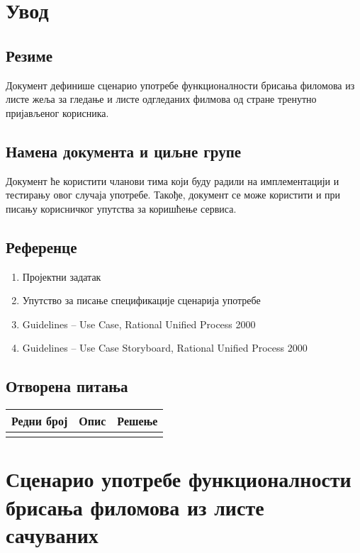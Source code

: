 \section{Увод}

\subsection{Резиме}

Документ дефинише сценарио употребе функционалности брисања филомова из листе жеља за гледање и листе 
одгледаних филмова од стране тренутно пријављеног корисника.

\subsection{Намена документа и циљне групе}

Документ ће користити чланови тима који буду радили на имплементацији и тестирању овог случаја
употребе. Такође, документ се може користити и при писању корисничког упутства за коришћење
сервиса.

\subsection{Референце}

\begin{enumerate}
    \item Пројектни задатак
    \item Упутство за писање спецификације сценарија употребе
    \item Guidelines – Use Case, Rational Unified Process 2000
    \item Guidelines – Use Case Storyboard, Rational Unified Process 2000
\end{enumerate}

\subsection{Отворена питања}

\noindent
\setcellgapes{4pt}
\makegapedcells
\begin{tabularx}{\linewidth}{|l|X|X|}
    \hline
    \textbf{Редни број} & \textbf{Опис} & \textbf{Решење} \\
    \hline
    & & \\
    \hline
\end{tabularx}

\section{Сценарио употребе функционалности брисања филомова из листе сачуваних}

